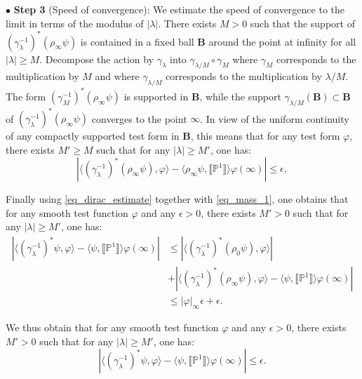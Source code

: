 \documentclass[12pt]{amsbook}%
\theoremstyle{definition}
\theoremstyle{remark}
\numberwithin{section}{chapter}
\numberwithin{subsection}{section}
\numberwithin{figure}{chapter}
\newcommand\intcur[1]{\llbracket #1 \rrbracket}
\def\bP{{\mathbb{P}}}
\def\la{\lambda}
\begin{document}
{{$\bullet$ \textbf{Step 3} (Speed of convergence): 
We estimate the speed of convergence to the limit in terms of the modulus of $|\lambda|$. There exists $M > 0$ such that the support of $ (\gamma_\la^{-1})^* ( \rho_\infty \psi ) $ is contained in a fixed ball $\mathbf{B}$ around the point at infinity for all $|\lambda| \geqslant M$. 
Decompose the action by $\gamma_\la$ into $\gamma_{\lambda/M}\circ \gamma_M$ where $\gamma_M$ corresponds to the multiplication by $M$ and where $\gamma_{\lambda/M}$ corresponds to the multiplication by $\lambda/M$. The form $(\gamma_M^{-1})^* (\rho_\infty \psi )$ is supported in $\mathbf{B}$, while the support $\gamma_{\lambda/M}(\mathbf{B}) \subset \mathbf{B}$ of $(\gamma_\la^{-1})^* (\rho_\infty \psi )$ converges to the point $\infty$. In view of the uniform continuity of any compactly supported test form in $\mathbf{B}$, this means that for any test form $\varphi$, there exists $M' \geqslant M$ such that for any $|\lambda| \geqslant M'$, one has: 
\begin{equation} \label{eq_dirac_estimate}
	\left | \langle   (\gamma_\la^{-1})^* (\rho_\infty \psi ) , \varphi  \rangle - \langle \rho_\infty \psi  , \intcur{\bP^1} \rangle \varphi(\infty)   \right | \leqslant \epsilon,
\end{equation}

Finally using \eqref{eq_dirac_estimate} together with \eqref{eq_mass_1}, one obtains that for any smooth test function $\varphi$ and any $\epsilon > 0$, there exists $M '> 0$ such that for any $|\lambda| \geqslant M' $, one has:
 \begin{align*}
  \left | \langle (\gamma_\la^{-1})^*\psi  , \varphi  \rangle  - \langle \psi  , \intcur{\bP^1} \rangle  \varphi(\infty ) \right |   &  	\leqslant \left | \langle (\gamma_\la^{-1})^* (\rho_0 \psi) , \varphi  \rangle  \right | \\ 
  &+ \left | \langle (\gamma_\la^{-1})^* (\rho_\infty \psi) , \varphi  \rangle   -\langle \psi  , \intcur{\bP^1} \rangle \varphi(\infty) \right | \\
  & \leqslant  |\varphi|_\infty \epsilon + \epsilon. 
\end{align*}
 
 We thus obtain that for any smooth test function $\varphi$ and any $\epsilon> 0$, there exists $M'> 0$ such that for any $|\lambda| \geqslant M'$, one has: 
 \begin{equation} \label{eq_convergence_volume_uniform}
 	\left | \langle (\gamma_\la^{-1})^*\psi  , \varphi  \rangle  - \langle \psi  , \intcur{\bP^1} \rangle  \varphi(\infty ) \right |   \leqslant \epsilon. 
 \end{equation}
 \smallskip 
 
}}
\end{document}
